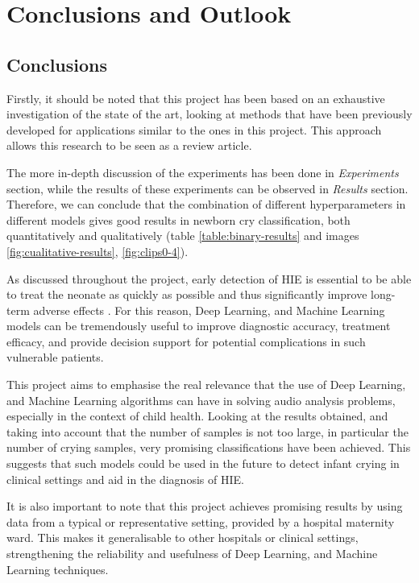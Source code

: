 %
\chapter{Conclusions and Outlook}
\label{ch::chapter6}

\section{Conclusions}
Firstly, it should be noted that this project has been based on an exhaustive investigation of the state of the art, looking at methods that have been previously developed for applications similar to the ones in this project. This approach allows this research to be seen as a review article. 

The more in-depth discussion of the experiments has been done in \textit{Experiments} section, while the results of these experiments can be observed in \textit{Results} section. Therefore, we can conclude that the combination of different hyperparameters in different models gives good results in newborn cry classification, both quantitatively and qualitatively (table \ref{table:binary-results} and images   \ref{fig:cualitative-results}, \ref{fig:clips0-4}).


As discussed throughout the project, early detection of HIE is essential to be able to treat the neonate as quickly as possible and thus significantly improve long-term adverse effects \cite{UpToDateNeonatalEncephalopathy}. For this reason, Deep Learning, and Machine Learning models can be tremendously useful to improve diagnostic accuracy, treatment efficacy, and provide decision support for potential complications in such vulnerable patients.

This project aims to emphasise the real relevance that the use of Deep Learning, and Machine Learning algorithms can have in solving audio analysis problems, especially in the context of child health. Looking at the results obtained, and taking into account that the number of samples is not too large, in particular the number of crying samples, very promising classifications have been achieved. This suggests that such models could be used in the future to detect infant crying in clinical settings and aid in the diagnosis of HIE.

It is also important to note that this project achieves promising results by using data from a typical or representative setting, provided by a hospital maternity ward. This makes it generalisable to other hospitals or clinical settings, strengthening the reliability and usefulness of Deep Learning, and Machine Learning techniques.



